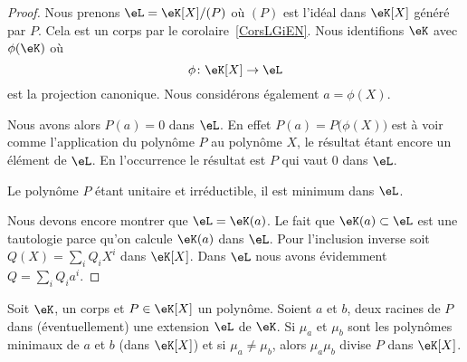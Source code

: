 \begin{proof}
    Nous prenons \( \eL=\eK[X]/(P)\) où \( (P)\) est l'idéal dans \( \eK[X]\) généré par \( P\). Cela est un corps par le corolaire~\ref{CorsLGiEN}. Nous identifions \( \eK\) avec \( \phi(\eK)\) où
    \begin{equation}
        \phi\colon \eK[X]\to \eL
    \end{equation}
    est la projection canonique. Nous considérons également \( a=\phi(X)\).

    Nous avons alors \( P(a)=0\) dans \( \eL\). En effet \( P(a)=P\big( \phi(X) \big)\) est à voir comme l'application du polynôme \( P\) au polynôme \( X\), le résultat étant encore un élément de \( \eL\). En l'occurrence le résultat est \( P\) qui vaut \( 0\) dans \( \eL\).

    Le polynôme \( P\) étant unitaire et irréductible, il est minimum dans \( \eL\).

    Nous devons encore montrer que \( \eL=\eK(a)\). Le fait que \( \eK(a)\subset \eL\) est une tautologie parce qu'on calcule \( \eK(a)\) dans \( \eL\). Pour l'inclusion inverse soit \( Q(X)=\sum_iQ_iX^i\) dans \( \eK[X]\). Dans \( \eL\) nous avons évidemment \( Q=\sum_iQ_ia^i\).
\end{proof}

\begin{proposition} \label{PropyMTEbH}
    Soit \( \eK\), un corps et \( P\in \eK[X]\) un polynôme. Soient \( a\) et \( b\), deux racines de \( P\) dans (éventuellement) une extension \( \eL\) de \( \eK\). Si \( \mu_a\) et \( \mu_b\) sont les polynômes minimaux de \( a\) et \( b\) (dans \( \eK[X]\)) et si \( \mu_a\neq \mu_b\), alors \( \mu_a\mu_b\) divise \( P\) dans \( \eK[X]\).
\end{proposition}

